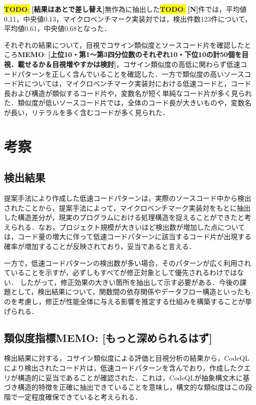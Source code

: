\documentclass[submit,techrep,noauthor]{ipsj}
\newcommand{\todo}[1]{\colorbox{yellow}{{\bf TODO}:}{\color{red} {\textbf{[#1]}}}}
\newcommand{\memo}[1]{\colorbox{magenta!30}{{\bf MEMO}:}{\color{red!50} {\textbf{[#1]}}}}
\begin{document}
\todo{結果はあとで差し替え}無作為に抽出した\todo{N}件では，平均値0.11，中央値0.13，マイクロベンチマーク実装対では，検出件数123件について，平均値0.61，中央値0.68となった．

それぞれの結果について，目視でコサイン類似度とソースコード片を確認したところ\memo{上位10・第1〜第3四分位数のそれぞれ10・下位10の計50個を目視．載せるか＆目視増やすかは検討}，コサイン類似度の高低に関わらず低速コードパターンを正しく含んでいることを確認した．一方で類似度の高いソースコード片については，マイクロベンチマーク実装対における低速コードと，コード長および構造が類似するコード片や，変数名が短く単純なコード片が多く見られた．類似度が低いソースコード片では，全体のコード長が大きいものや，変数名が長い，リテラルを多く含むコードが多く見られた．


\section{考察}
\label{sec:discussion}


\subsection{検出結果}

提案手法により作成した低速コードパターンは，実際のソースコード中から検出されたことから，提案手法によって，マイクロベンチマーク実装対をもとに抽出した構造差分が，現実のプログラムにおける処理構造を捉えることができたと考えられる．なお，プロジェクト規模が大きいほど検出数が増加した点については，コード量の増大に伴って低速コードパターンに該当するコード片が出現する確率が増加することが反映されており，妥当であると言える．

一方で，低速コードパターンの検出数が多い場合，そのパターンが広く利用されていることを示すが，必ずしもすべてが修正対象として優先されるわけではない．
したがって，修正効果の大きい箇所を抽出して示す必要がある．今後の課題として，検出結果について，関数間の依存関係やデータフロー構造といったものを考慮し，修正が性能全体に与える影響を推定する仕組みを構築することが挙げられる．

\subsection{類似度指標\memo{もっと深められるはず}}

検出結果に対する，コサイン類似度による評価と目視分析の結果から，CodeQLにより検出されたコード片は，低速コードパターンを含んでおり，作成したクエリが構造的に妥当であることが確認された．これは，CodeQLが抽象構文木に基づき構造的特徴を正確に抽出できていることを意味し，構文的な類似度はこの段階で一定程度確保できていると考えられる．
\end{document}
